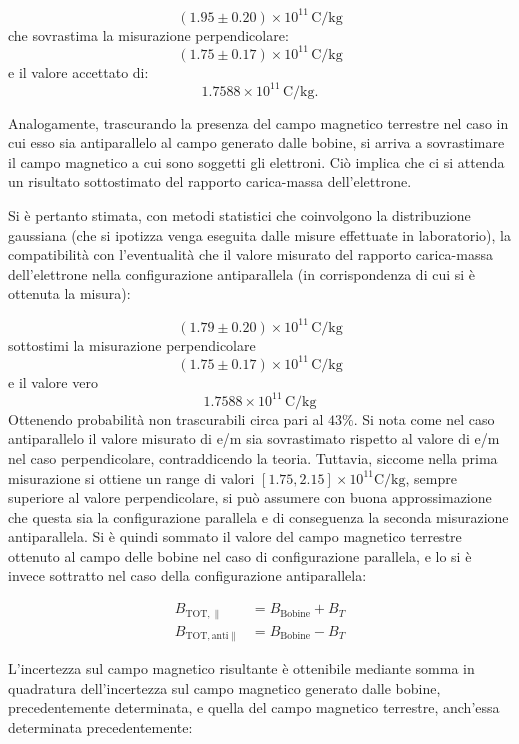 \documentclass[a4paper,12pt]{article}
\begin{document}
\[
(1.95 \pm 0.20) \times 10^{11} \, \text{C/kg}
\]
che sovrastima la misurazione perpendicolare:
\[
(1.75 \pm 0.17) \times 10^{11} \, \text{C/kg}
\]
e il valore accettato di:
\[
1.7588 \times 10^{11} \, \text{C/kg}.
\]

Analogamente, trascurando la presenza del campo magnetico terrestre nel caso in cui esso sia antiparallelo al campo generato dalle bobine, si arriva a sovrastimare il campo magnetico a cui sono soggetti gli elettroni. Ciò implica che ci si attenda un risultato sottostimato del rapporto carica-massa dell’elettrone. 

Si è pertanto stimata, con metodi statistici che coinvolgono la distribuzione gaussiana (che si ipotizza venga eseguita dalle misure effettuate in laboratorio), la compatibilità con l’eventualità che il valore misurato del rapporto carica-massa dell’elettrone nella configurazione antiparallela (in corrispondenza di cui si è ottenuta la misura):

\[
(1.79 \pm 0.20) \times 10^{11} \, \text{C/kg}
\]
sottostimi la misurazione perpendicolare 
\[
(1.75 \pm 0.17) \times 10^{11} \, \text{C/kg}
\]
e il valore vero
\[
1.7588 \times 10^{11} \, \text{C/kg}
\]
Ottenendo probabilità non trascurabili circa pari al \(43\%\).
Si nota come nel caso antiparallelo il valore misurato di e/m sia sovrastimato rispetto al valore di e/m nel caso perpendicolare, contraddicendo la teoria. Tuttavia, siccome nella prima misurazione si ottiene un range di valori \([1.75, 2.15] \times 10^{11}\text{C/kg}\), sempre superiore al valore perpendicolare, si può assumere con buona approssimazione che questa sia la configurazione parallela e di conseguenza la seconda misurazione antiparallela.
Si è quindi sommato il valore del campo magnetico terrestre ottenuto al campo delle bobine nel caso di configurazione parallela, e lo si è invece sottratto nel caso della configurazione antiparallela:

\begin{align}
    B_{\text{TOT}, \parallel} &= B_{\text{Bobine}} + B_T \label{eq:B_tot_parallel} \\
    B_{\text{TOT}, \text{anti}\parallel} &= B_{\text{Bobine}} - B_T \label{eq:B_tot_antiparallel}
\end{align}

L’incertezza sul campo magnetico risultante è ottenibile mediante somma in quadratura dell’incertezza sul campo magnetico generato dalle bobine, precedentemente determinata, e quella del campo magnetico terrestre, anch’essa determinata precedentemente:
\end{document}
